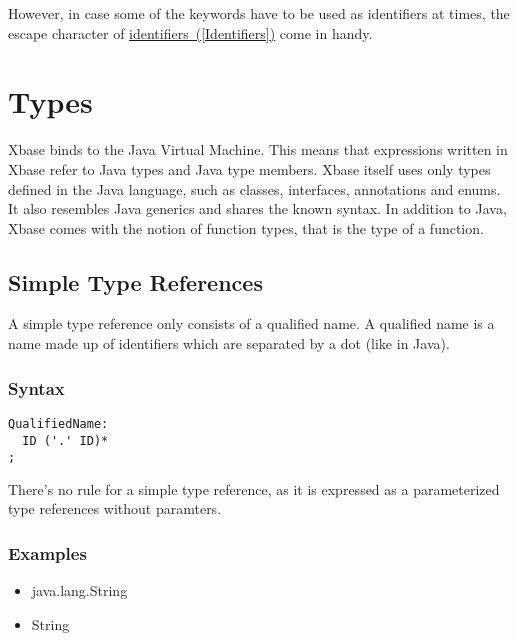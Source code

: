 \documentclass[a4paper,10pt]{scrreprt}
\newlength{\itemindentlen}
\begin{document}
\addtolength{\itemindentlen}{2em}


However, in case some of the keywords have to be used as identifiers at times, the escape character of 
\hyperref[Identifiers]{identifiers~(\ref*{Identifiers})} come in handy. 





\chapter{Types}
\label{Types}
Xbase binds to the Java Virtual Machine. This means that expressions written in Xbase refer to Java types and Java type members. Xbase itself uses only types 
defined in the Java language, such as classes, interfaces, annotations and enums. It also resembles Java generics and shares the known syntax. In addition to Java, Xbase comes with the
notion of function types, that is the type of a function. 

\section{Simple Type References}
\label{TypeReferences}
A simple type reference only consists of a qualified name. A qualified name is a name made up of identifiers which are separated by a dot (like in Java).

\subsection{Syntax}

\begin{lstlisting}
QualifiedName:
  ID ('.' ID)*
;	

\end{lstlisting}


There's no rule for a simple type reference, as it is expressed as a parameterized type references without paramters.




\subsection{Examples}


\setlength{\itemindentlen}{\textwidth}
\begin{itemize}
\addtolength{\itemindentlen}{-2em}

\item \begin{minipage}[t]{\itemindentlen}
java.lang.String
\end{minipage}

\item \begin{minipage}[t]{\itemindentlen}
String
\end{minipage}

\end{itemize}
\addtolength{\itemindentlen}{2em}
\end{document}
